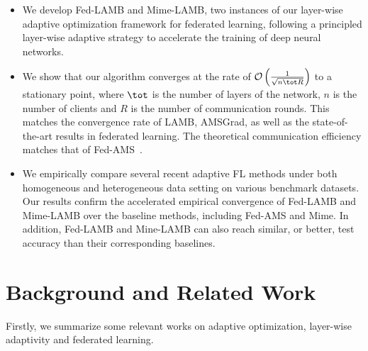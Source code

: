 \documentclass[nohyperref]{article}
\theoremstyle{plain}
\theoremstyle{definition}
\theoremstyle{remark}
\begin{document}
\begin{itemize}
\item We develop Fed-LAMB and Mime-LAMB, two instances of our layer-wise adaptive optimization framework for federated learning, following a principled layer-wise adaptive strategy to accelerate the training of deep neural networks. 


\item We show that our algorithm converges at the rate of $\mathcal{O}\left(\frac{1}{\sqrt{n\tot R}} \right)$ to a stationary point, where $\tot$ is the number of layers of the network, $n$ is the number of clients and $R$ is the number of communication rounds. This matches the convergence rate of LAMB, AMSGrad, as well as the state-of-the-art results in federated learning. The theoretical communication efficiency matches that of Fed-AMS~\cite{chen2020toward}.

\item We empirically compare several recent adaptive FL methods under both homogeneous and heterogeneous data setting on various benchmark datasets. 
Our results confirm the accelerated empirical convergence of Fed-LAMB and Mime-LAMB over the baseline methods, including Fed-AMS and Mime. 
In addition, Fed-LAMB and Mine-LAMB can also reach similar, or better, test accuracy than their corresponding baselines.
\end{itemize}



\section{Background and Related Work}\label{sec:related}

Firstly, we summarize some relevant works on adaptive optimization, layer-wise adaptivity and federated learning.
\end{document}

